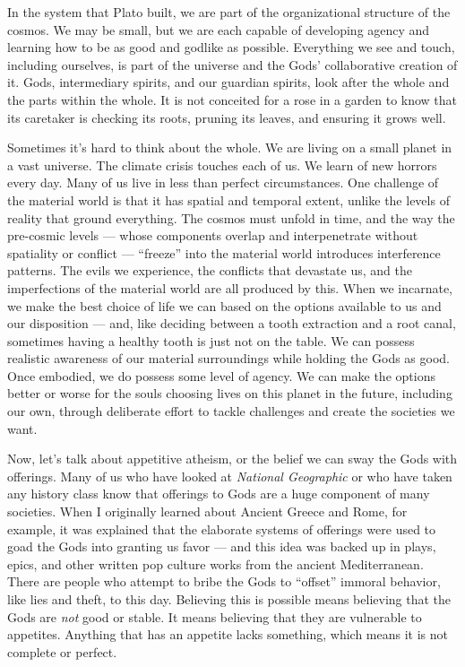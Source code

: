 \documentclass[
]{book}
\begin{document}
In the system that Plato built, we are part of the organizational structure of the cosmos. We may be small, but we are each capable of developing agency and learning how to be as good and godlike as possible. Everything we see and touch, including ourselves, is part of the universe and the Gods' collaborative creation of it. Gods, intermediary spirits, and our guardian spirits, look after the whole and the parts within the whole. It is not conceited for a rose in a garden to know that its caretaker is checking its roots, pruning its leaves, and ensuring it grows well.

Sometimes it's hard to think about the whole. We are living on a small planet in a vast universe. The climate crisis touches each of us. We learn of new horrors every day. Many of us live in less than perfect circumstances. One challenge of the material world is that it has spatial and temporal extent, unlike the levels of reality that ground everything. The cosmos must unfold in time, and the way the pre-cosmic levels --- whose components overlap and interpenetrate without spatiality or conflict --- ``freeze'' into the material world introduces interference patterns. The evils we experience, the conflicts that devastate us, and the imperfections of the material world are all produced by this. When we incarnate, we make the best choice of life we can based on the options available to us and our disposition --- and, like deciding between a tooth extraction and a root canal, sometimes having a healthy tooth is just not on the table. We can possess realistic awareness of our material surroundings while holding the Gods as good. Once embodied, we do possess some level of agency. We can make the options better or worse for the souls choosing lives on this planet in the future, including our own, through deliberate effort to tackle challenges and create the societies we want.

Now, let's talk about appetitive atheism, or the belief we can sway the Gods with offerings. Many of us who have looked at \emph{National Geographic} or who have taken any history class know that offerings to Gods are a huge component of many societies. When I originally learned about Ancient Greece and Rome, for example, it was explained that the elaborate systems of offerings were used to goad the Gods into granting us favor --- and this idea was backed up in plays, epics, and other written pop culture works from the ancient Mediterranean. There are people who attempt to bribe the Gods to ``offset'' immoral behavior, like lies and theft, to this day. Believing this is possible means believing that the Gods are \emph{not} good or stable. It means believing that they are vulnerable to appetites. Anything that has an appetite lacks something, which means it is not complete or perfect.
\end{document}
